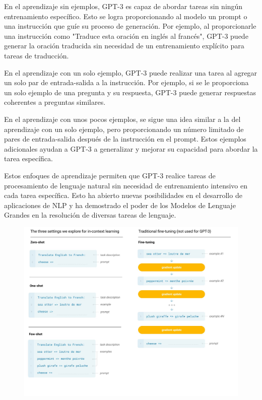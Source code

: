 En el aprendizaje sin ejemplos, GPT-3 es capaz de abordar tareas sin ningún entrenamiento específico. Esto se logra proporcionando al modelo un prompt o una instrucción que guíe su proceso de generación. Por ejemplo, al proporcionarle una instrucción como "Traduce esta oración en inglés al francés", GPT-3 puede generar la oración traducida sin necesidad de un entrenamiento explícito para tareas de traducción.

En el aprendizaje con un solo ejemplo, GPT-3 puede realizar una tarea al agregar un solo par de entrada-salida a la instrucción. Por ejemplo, si se le proporciona un solo ejemplo de una pregunta y su respuesta, GPT-3 puede generar respuestas coherentes a preguntas similares.

En el aprendizaje con unos pocos ejemplos, se sigue una idea similar a la del aprendizaje con un solo ejemplo, pero proporcionando un número limitado de pares de entrada-salida después de la instrucción en el prompt. Estos ejemplos adicionales ayudan a GPT-3 a generalizar y mejorar su capacidad para abordar la tarea específica.

Estos enfoques de aprendizaje permiten que GPT-3 realice tareas de procesamiento de lenguaje natural sin necesidad de entrenamiento intensivo en cada tarea específica. Esto ha abierto nuevas posibilidades en el desarrollo de aplicaciones de NLP y ha demostrado el poder de los Modelos de Lenguaje Grandes en la resolución de diversas tareas de lenguaje.


 \begin{figure}[h]
        	\includegraphics[scale = 0.18]{pics/zeroonefew.png}
        \end{figure}



